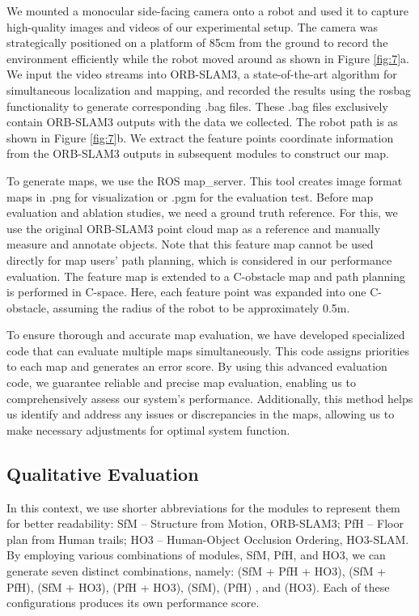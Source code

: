 \documentclass[letterpaper, 10 pt, conference]{ieeeconf}
\begin{document}
We mounted a monocular side-facing camera onto a robot and used it to capture high-quality images and videos of our experimental setup. The camera was strategically positioned on a platform of 85cm from the ground to record the environment efficiently while the robot moved around as shown in Figure \ref{fig:7}a. We input the video streams into ORB-SLAM3, a state-of-the-art algorithm for simultaneous localization and mapping, and recorded the results using the rosbag functionality to generate corresponding .bag files. These .bag files exclusively contain ORB-SLAM3 outputs with the data we collected. The robot path is as shown in Figure \ref{fig:7}b. We extract the feature points coordinate information from the ORB-SLAM3 outputs in subsequent modules to construct our map. 

To generate maps, we use the ROS map\_server\cite{r46}. This tool creates image format maps in .png for visualization or .pgm for the evaluation test. Before map evaluation and ablation studies, we need a ground truth reference. For this, we use the original ORB-SLAM3 point cloud map as a reference and manually measure and annotate objects. Note that this feature map cannot be used directly for map users' path planning, which is considered in our performance evaluation. The feature map is extended to a C-obstacle map and path planning is performed in C-space. Here, each feature point was expanded into one C-obstacle, assuming the radius of the robot to be approximately 0.5m.


\figG

To ensure thorough and accurate map evaluation, we have developed specialized code that can evaluate multiple maps simultaneously. This code assigns priorities to each map and generates an error score. By using this advanced evaluation code, we guarantee reliable and precise map evaluation, enabling us to comprehensively assess our system's performance. Additionally, this method helps us identify and address any issues or discrepancies in the maps, allowing us to make necessary adjustments for optimal system function.


\subsection{Qualitative Evaluation}

In this context, we use shorter abbreviations for the modules to represent them for better readability: SfM –  Structure from Motion, ORB-SLAM3; PfH – Floor plan from Human trails; HO3 – Human-Object Occlusion Ordering, HO3-SLAM. By employing various combinations of modules, SfM, PfH, and HO3, we can generate seven distinct combinations, namely: (SfM + PfH + HO3), (SfM + PfH), (SfM + HO3), (PfH + HO3), (SfM), (PfH) , and (HO3). Each of these configurations produces its own performance score.
\end{document}
